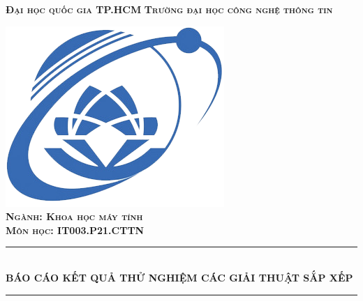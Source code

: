 \documentclass[12pt]{article}
\begin{document}
\begin{titlepage}

\newcommand{\HRule}{\rule{\linewidth}{0.5mm}} 

\center %
 

\textsc{\LARGE \bf Đại học quốc gia TP.HCM}
\newline
\textsc{\LARGE \bf Trường đại học công nghệ thông tin}\\[1.5cm] 


\graphicspath{ {./logo/} }
 
\includegraphics[scale=0.5]{logo-uit.png}\\[1.5cm]

\textsc{\Large \bf Ngành: Khoa học máy tính}\\[0.5cm] 

\textsc{\large \bf Môn học: IT003.P21.CTTN}\\[1.0cm] 


\HRule \\[0.4cm]
{ \huge \bfseries BÁO CÁO KẾT QUẢ THỬ NGHIỆM CÁC GIẢI THUẬT SẮP XẾP}\\[0.4cm] 
\HRule \\[1.5cm]
 


\end{titlepage}
\end{document}
